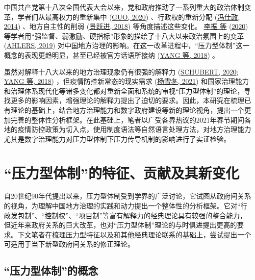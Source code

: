 \documentclass[
  12pt,
]{ctexart}
\begin{document}
中国共产党第十八次全国代表大会以来，党和政府推动了一系列重大的政治体制变革，学者们从最高权力的重新集中 (\protect\hyperlink{ref-Guo2020}{GUO, 2020}) 、行政权的重新分配 (\protect\hyperlink{ref-FengShiZheng2014}{冯仕政, 2014}) 、地方自主性的削弱 (\protect\hyperlink{ref-JingYueJin2018}{景跃进, 2018}) 等角度描述这些变化。 \protect\hyperlink{ref-LiZhenEtAl2020c}{李振 等} (\protect\hyperlink{ref-LiZhenEtAl2020c}{2020}) 等学者用``强监督、弱激励、硬指标''形象的描绘了十八大以来政治氛围上的变革 (\protect\hyperlink{ref-Ahlers2019}{AHLERS, 2019}) 对中国地方治理的影响。在这一改革进程中，``压力型体制''这一概念的表现更趋明显，甚至已经被官方话语所接纳 (\protect\hyperlink{ref-YangYan2018}{YANG 等, 2018}) 。

虽然对解释十八大以来的地方治理现象仍有很强的解释力 (\protect\hyperlink{ref-Schubert2020}{SCHUBERT, 2020}; \protect\hyperlink{ref-YangYan2018}{YANG 等, 2018}) ，但疫情防控新常态的现实需求 (\protect\hyperlink{ref-YangXueDong2021}{杨雪冬, 2021}) 和国家治理能力和治理体系现代化等诸多变化都对重新全面和系统的审视``压力型体制''的理论，寻找更多的影响因素，增强理论的解释力提出了迫切的要求。因此，本研究在梳理已有理论的基础上，结合地方治理能力和数字政府建设等新的理论视角，提出一个更加完善的整体性分析框架。在此基础上，笔者以广受各界热议的2021年春节期间各地的疫情防控政策为切入点，使用制度语法等自然语言处理方法，对地方治理能力尤其是数字治理能力对压力型体制下压力传导机制的影响进行了实证检验。

\hypertarget{ux538bux529bux578bux4f53ux5236ux7684ux7279ux5f81ux8d21ux732eux53caux5176ux65b0ux53d8ux5316}{%
\section{``压力型体制''的特征、贡献及其新变化}\label{ux538bux529bux578bux4f53ux5236ux7684ux7279ux5f81ux8d21ux732eux53caux5176ux65b0ux53d8ux5316}}

自20世纪90年代提出以来，压力型体制受到学界的广泛讨论，它试图从政府间关系的视角，为理解中国地方治理的实践和动力提出一个整体性的分析框架。它对``行政发包制''、``控制权''、``项目制''等富有解释力的经典理论具有较强的整合能力，但近年来政府关系的巨大改革，也对``压力型体制''理论的与时俱进提出更高的要求。下文笔者在梳理压力型特征以及和其他经典理论联系的基础上，尝试提出一个可适用于当下新型政府间关系的修正理论。

\hypertarget{ux538bux529bux578bux4f53ux5236ux7684ux6982ux5ff5}{%
\subsection{``压力型体制''的概念}\label{ux538bux529bux578bux4f53ux5236ux7684ux6982ux5ff5}}
\end{document}
